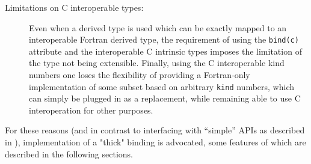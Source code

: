\documentclass{article}
\begin{document}
\begin{description}
\item[Limitations on C interoperable types:] 
Even when a derived type is used which can be exactly mapped
to an interoperable Fortran derived type, the requirement of using the
\texttt{bind(c)} attribute and the interoperable C intrinsic types
imposes the limitation of the type not being
extensible. Finally, using the C interoperable kind numbers
one loses the flexibility of providing a Fortran-only 
implementation of some subset based on arbitrary \texttt{kind} numbers, which
can simply be plugged in as a replacement, while remaining able to use C
interoperation for other purposes.
\end{description}
\noindent
 For these reasons (and in contrast to interfacing with ``simple'' APIs as
described in \cite{donev}), implementation
of a "thick" binding is advocated, some features of which are described 
in the following sections.
\end{document}

